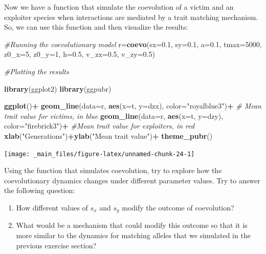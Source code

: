 \documentclass[
]{book}
\newenvironment{Shaded}{\begin{snugshade}}{\end{snugshade}}
\newcommand{\AttributeTok}[1]{\textcolor[rgb]{0.13,0.29,0.53}{#1}}
\newcommand{\CommentTok}[1]{\textcolor[rgb]{0.56,0.35,0.01}{\textit{#1}}}
\newcommand{\DecValTok}[1]{\textcolor[rgb]{0.00,0.00,0.81}{#1}}
\newcommand{\FloatTok}[1]{\textcolor[rgb]{0.00,0.00,0.81}{#1}}
\newcommand{\FunctionTok}[1]{\textcolor[rgb]{0.13,0.29,0.53}{\textbf{#1}}}
\newcommand{\NormalTok}[1]{#1}
\newcommand{\OtherTok}[1]{\textcolor[rgb]{0.56,0.35,0.01}{#1}}
\newcommand{\SpecialCharTok}[1]{\textcolor[rgb]{0.81,0.36,0.00}{\textbf{#1}}}
\newcommand{\StringTok}[1]{\textcolor[rgb]{0.31,0.60,0.02}{#1}}
\begin{document}
Now we have a function that simulate the coevolution of a victim and an exploiter species when interactions are mediated by a trait matching mechanism. So, we can use this function and then visualize the results:

\begin{Shaded}
\begin{Highlighting}[]
\CommentTok{\#Running the coevolutionary model}
\NormalTok{r}\OtherTok{=}\FunctionTok{coevo}\NormalTok{(}\AttributeTok{sx=}\FloatTok{0.1}\NormalTok{, }\AttributeTok{sy=}\FloatTok{0.1}\NormalTok{, }\AttributeTok{a=}\FloatTok{0.1}\NormalTok{, }\AttributeTok{tmax=}\DecValTok{5000}\NormalTok{, }\AttributeTok{z0\_x=}\DecValTok{5}\NormalTok{, }\AttributeTok{z0\_y=}\DecValTok{1}\NormalTok{, }\AttributeTok{h=}\FloatTok{0.5}\NormalTok{, }\AttributeTok{v\_zx=}\FloatTok{0.5}\NormalTok{, }\AttributeTok{v\_zy=}\FloatTok{0.5}\NormalTok{)}

\CommentTok{\#Plotting the results}

\FunctionTok{library}\NormalTok{(ggplot2)}
\FunctionTok{library}\NormalTok{(ggpubr)}

\FunctionTok{ggplot}\NormalTok{()}\SpecialCharTok{+}
  \FunctionTok{geom\_line}\NormalTok{(}\AttributeTok{data=}\NormalTok{r, }\FunctionTok{aes}\NormalTok{(}\AttributeTok{x=}\NormalTok{t, }\AttributeTok{y=}\NormalTok{dzx), }\AttributeTok{color=}\StringTok{"royalblue3"}\NormalTok{)}\SpecialCharTok{+} \CommentTok{\# Mean trait value for victims, in blue}
  \FunctionTok{geom\_line}\NormalTok{(}\AttributeTok{data=}\NormalTok{r, }\FunctionTok{aes}\NormalTok{(}\AttributeTok{x=}\NormalTok{t, }\AttributeTok{y=}\NormalTok{dzy), }\AttributeTok{color=}\StringTok{"firebrick3"}\NormalTok{)}\SpecialCharTok{+} \CommentTok{\#Mean trait value for exploiters, in red}
  \FunctionTok{xlab}\NormalTok{(}\StringTok{"Generations"}\NormalTok{)}\SpecialCharTok{+}\FunctionTok{ylab}\NormalTok{(}\StringTok{"Mean trait value"}\NormalTok{)}\SpecialCharTok{+}
  \FunctionTok{theme\_pubr}\NormalTok{()}
\end{Highlighting}
\end{Shaded}

\texttt{[image: \_main\_files/figure-latex/unnamed-chunk-24-1]}

Using the function that simulates coevolution, try to explore how the coevolutionary dynamics changes under different parameter values. Try to answer the following question:

\begin{enumerate}
\def\labelenumi{\arabic{enumi}.}
\item
  How different values of \(s_{x}\) and \(s_{y}\) modify the outcome of coevolution?
\item
  What would be a mechanism that could modify this outcome so that it is more similar to the dynamics for matching alleles that we simulated in the previous exercise section?
\end{enumerate}
\end{document}

